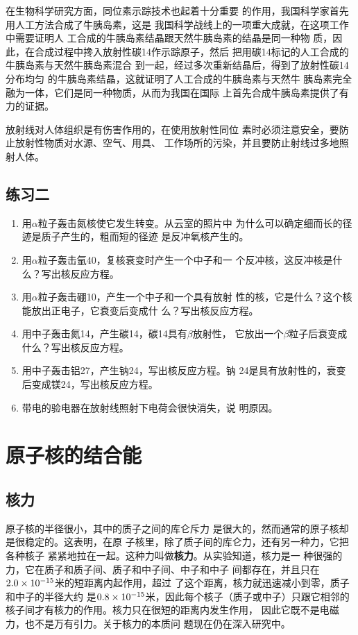 在生物科学研究方面，同位素示踪技术也起着十分重要
的作用，我国科学家首先用人工方法合成了牛胰岛素，这是
我国科学战线上的一项重大成就，在这项工作中需要证明人
工合成的牛胰岛素结晶跟天然牛胰岛素的结晶是同一种物
质，因此，在合成过程中搀入放射性碳14作示踪原子，然后
把用碳14标记的人工合成的牛胰岛素与天然牛胰岛素混合
到一起，经过多次重新结晶后，得到了放射性碳14分布均匀
的牛胰岛素结晶，这就证明了人工合成的牛胰岛素与天然牛
胰岛素完全融为一体，它们是同一种物质，从而为我国在国际
上首先合成牛胰岛素提供了有力的证据。

放射线对人体组织是有伤害作用的，在使用放射性同位
素时必须注意安全，要防止放射性物质对水源、空气、用具、
工作场所的污染，并且要防止射线过多地照射人体。


\subsection*{练习二}

\begin{enumerate}
    \item 用$\alpha$粒子轰击氮核使它发生转变。从云室的照片中
    为什么可以确定细而长的径迹是质子产生的，粗而短的径迹
    是反冲氧核产生的。
    \item 用$\alpha$粒子轰击氩40，复核衰变时产生一个中子和一
    个反冲核，这反冲核是什么？写出核反应方程。
    \item 用$\alpha$粒子轰击硼10，产生一个中子和一个具有放射
    性的核，它是什么？这个核能放出正电子，它衰变后变成什
    么？写出核反应方程。
    \item 用中子轰击氮14，产生碳14，碳14具有$\beta$放射性，
    它放出一个$\beta$粒子后衰变成什么？写出核反应方程。
    \item 用中子轰击铝27，产生钠24，写出核反应方程。钠
    24是具有放射性的，衰变后变成镁24，写出核反应方程。
    \item 带电的验电器在放射线照射下电荷会很快消失，说
    明原因。
\end{enumerate}


\section{原子核的结合能}
\subsection{核力} 

原子核的半径很小，其中的质子之间的库仑斥力
是很大的，然而通常的原子核却是很稳定的。这表明，在原
子核里，除了质子间的库仑力，还有另一种力，它把各种核子
紧紧地拉在一起。这种力叫做\textbf{核力}。从实验知道，核力是一
种很强的力，它在质子和质子间、质子和中子间、中子和中子
间都存在，并且只在$2.0\times10^{-15}$米的短距离内起作用，超过
了这个距离，核力就迅速减小到零，质子和中子的半径大约
是$0.8\times10^{-15}$米，因此每个核子（质子或中子）只跟它相邻的
核子间才有核力的作用。核力只在很短的距离内发生作用，
因此它既不是电磁力，也不是万有引力。关于核力的本质问
题现在仍在深入研究中。

